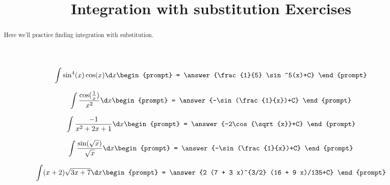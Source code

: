 \documentclass[handout]{ximera}
\title[Exercises:]{Integration with substitution Exercises}
\begin{document}
\begin{abstract}
  Here we'll practice finding integration with substitution.
\end{abstract}
\maketitle

\begin{exercise}
\[
\int \sin^4(x)\cos(x) \d x \begin{prompt} = \answer{\frac{1}{5} \sin^5(x)+C} \end{prompt}
\]

\end{exercise}

\begin{exercise}
\[
\int \frac{\cos(\frac{1}{x})}{x^2} \d x \begin{prompt} = \answer{-\sin(\frac{1}{x})+C} \end{prompt}
\]

\end{exercise}

\begin{exercise}
\[
\int \frac{-1}{x^2+2x+1} \d x \begin{prompt} = \answer{-2\cos{\sqrt{x}}+C} \end{prompt}
\]

\end{exercise}


\begin{exercise}
\[
\int \frac{\sin(\sqrt{x})}{\sqrt{x}} \d x \begin{prompt} = \answer{-\sin(\frac{1}{x})+C} \end{prompt}
\]

\end{exercise}

\begin{exercise}
\[
\int (x+2)\sqrt{3x+7} \d x \begin{prompt} = \answer{2 (7 + 3 x)^{3/2} (16 + 9 x)/135+C} \end{prompt}
\]

\end{exercise}
\end{document}
